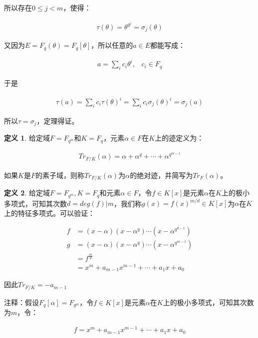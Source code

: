 \documentclass[12pt, a4paper, oneside]{ctexart}
\theoremstyle{definition}
\newtheorem*{definition}{定义}
\begin{document}
所以存在$0\leqslant j<m$，使得：

\begin{align*}
\tau(\theta)=\theta^{q^j}=\sigma_j(\theta)
\end{align*}

又因为$E=F_q(\theta)=F_q[\theta]$，所以任意的$a\in E$都能写成：

\begin{align*}
a=\sum_ic_i\theta^i,\;\;\; c_i\in F_q
\end{align*}

于是

\begin{align*}
\tau(a)=\sum_ic_i\tau(\theta)^i=\sum_ic_i\sigma_j(\theta)^i=\sigma_j(a)
\end{align*}

所以$\tau=\sigma_j$，定理得证。

\begin{definition}
给定域$F=F_{q^m}$和$K=F_q$，元素$\alpha\in F$在$K$上的迹定义为：

\begin{align*}
Tr_{F/K}(\alpha)=\alpha+\alpha^q+\cdots+\alpha^{q^{m-1}}
\end{align*}

如果$K$是$F$的素子域，则称$Tr_{F/K}(\alpha)$为$\alpha$的绝对迹，并简写为$Tr_F(\alpha)$。
\end{definition}

\begin{definition}
给定域$F=F_{q^m},K=F_q$和元素$\alpha\in F$，令$f\in K[x]$是元素$\alpha$在$K$上的极小多项式，可知其次数$d=deg(f)|m$，我们称$g(x)=f(x)^{m/d}\in K[x]$为$\alpha$在$K$上的特征多项式。可以验证：

\begin{align*}
f&=(x-\alpha)(x-\alpha^q)\cdots(x-\alpha^{q^{d-1}})\\
g&=(x-\alpha)(x-\alpha^q)\cdots(x-\alpha^{q^{m-1}})\\
&=f^{\frac{m}{d}}\\
&=x^m+a_{m-1}x^{m-1}+\cdots+a_1x+a_0
\end{align*}

因此$Tr_{F/K}=-a_{m-1}$
\end{definition}

注释：假设$F_q[\alpha]=F_{q^m}$，令$f\in K[x]$是元素$\alpha$在$K$上的极小多项式，可知其次数为$m$，令：

\begin{align*}
f=x^m+a_{m-1}x^{m-1}+\cdots+a_1x+a_0
\end{align*}
\end{document}
